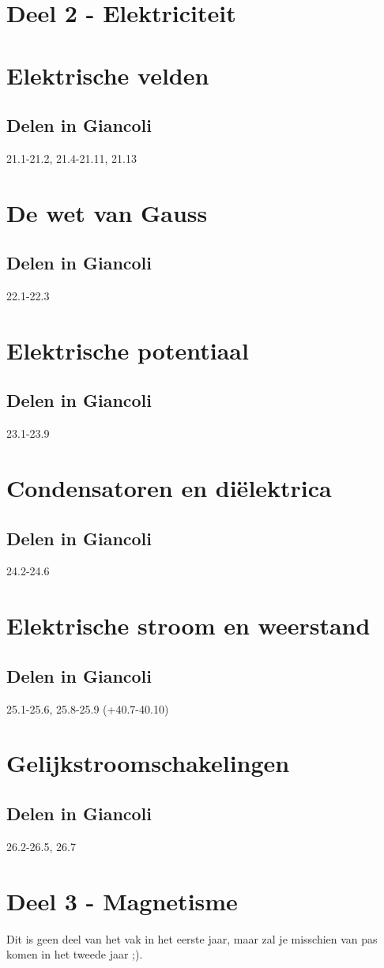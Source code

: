 \documentclass[12pt,a4paper]{article}
\begin{document}
	
	\section{Deel 2 - Elektriciteit}
	\section{Elektrische velden}
	\subsection{Delen in Giancoli}
	21.1-21.2, 21.4-21.11, 21.13 
	\section{De wet van Gauss}
	\subsection{Delen in Giancoli}
	22.1-22.3
	\section{Elektrische potentiaal}
	\subsection{Delen in Giancoli}
	23.1-23.9
	\section{Condensatoren en diëlektrica}
	\subsection{Delen in Giancoli}
	24.2-24.6
	\section{Elektrische stroom en weerstand}
	\subsection{Delen in Giancoli}
	25.1-25.6, 25.8-25.9 (+40.7-40.10)
	\section{Gelijkstroomschakelingen}
	\subsection{Delen in Giancoli}
	26.2-26.5, 26.7
	\newpage
	\section{Deel 3 - Magnetisme}
	Dit is geen deel van het vak in het eerste jaar, maar zal je misschien van pas komen in het tweede jaar ;).
\end{document}
